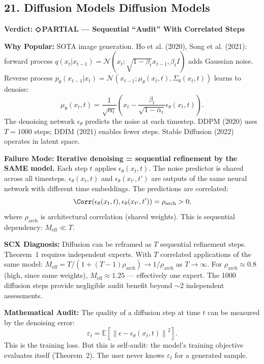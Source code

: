\documentclass[12pt,a4paper]{article}
\theoremstyle{definition}
\newcommand{\weakness}{{\color{weakcolor}\textbf{◇\,PARTIAL}}}
\newcommand{\E}{\mathbb{E}}
\newcommand{\cN}{\mathcal{N}}
\newcommand{\norm}[1]{\left\lVert#1\right\rVert}
\newcommand{\auditHeader}[1]{\medskip\noindent\textbf{\large #1}\medskip}
\newcommand{\whyPopular}{\noindent\textbf{Why Popular:} }
\newcommand{\whyFail}{\noindent\textbf{Failure Mode:} }
\newcommand{\diagnosis}{\noindent\textbf{SCX Diagnosis:} }
\newcommand{\mathAudit}{\noindent\textbf{Mathematical Audit:} }
\begin{document}
\subsection{21. Diffusion Models Diffusion Models}

\auditHeader{Verdict: \weakness{} — Sequential ``Audit'' With Correlated Steps}

\whyPopular{} SOTA image generation. Ho et al. (2020), Song et al. (2021): forward process $q(x_t|x_{t-1}) = \cN(x_t; \sqrt{1-\beta_t}x_{t-1}, \beta_t I)$ adds Gaussian noise. Reverse process $p_\theta(x_{t-1}|x_t) = \cN(x_{t-1}; \mu_\theta(x_t, t), \Sigma_\theta(x_t, t))$ learns to denoise:
\[
\mu_\theta(x_t, t) = \frac{1}{\sqrt{\alpha_t}}\left(x_t - \frac{\beta_t}{\sqrt{1-\bar{\alpha}_t}}\epsilon_\theta(x_t, t)\right).
\]
The denoising network $\epsilon_\theta$ predicts the noise at each timestep. DDPM (2020) uses $T=1000$ steps; DDIM (2021) enables fewer steps. Stable Diffusion (2022) operates in latent space.

\whyFail{} \textbf{Iterative denoising = sequential refinement by the SAME model.} Each step $t$ applies $\epsilon_\theta(x_t, t)$. The noise predictor is shared across all timesteps. $\epsilon_\theta(x_t, t)$ and $\epsilon_\theta(x_{t'}, t')$ are outputs of the same neural network with different time embeddings. The predictions are correlated:
\[
\Corr(\epsilon_\theta(x_t, t), \epsilon_\theta(x_{t'}, t')) = \rho_{\text{arch}} > 0,
\]
where $\rho_{\text{arch}}$ is architectural correlation (shared weights). This is sequential dependency: $M_{\text{eff}} \ll T$.

\diagnosis{} Diffusion can be reframed as $T$ sequential refinement steps. Theorem~1 requires independent experts. With $T$ correlated applications of the same model: $M_{\text{eff}} = T / (1 + (T-1)\rho_{\text{arch}}) \to 1/\rho_{\text{arch}}$ as $T \to \infty$. For $\rho_{\text{arch}} \approx 0.8$ (high, since same weights), $M_{\text{eff}} \approx 1.25$ — effectively one expert. The 1000 diffusion steps provide negligible audit benefit beyond $\sim$2 independent assessments.

\mathAudit{} The quality of a diffusion step at time $t$ can be measured by the denoising error:
\[
\varepsilon_t = \E[\norm{\epsilon - \epsilon_\theta(x_t, t)}^2].
\]
This is the training loss. But this is self-audit: the model's training objective evaluates itself (Theorem~2). The user never knows $\varepsilon_t$ for a generated sample.
\end{document}
